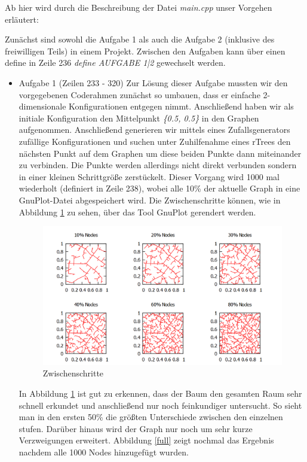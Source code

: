 \documentclass[a4paper]{scrartcl}
\begin{document}
Ab hier wird durch die Beschreibung der Datei \textit{main.cpp} unser Vorgehen erläutert:

Zunächst sind sowohl die Aufgabe 1 als auch die Aufgabe 2 (inklusive des freiwilligen Teils) in einem Projekt. Zwischen den Aufgaben kann über einen define in Zeile 236 \textit{define AUFGABE 1|2} gewechselt werden. 

\begin{itemize}
	\item Aufgabe 1 (Zeilen 233 - 320)
		Zur Lösung dieser Aufgabe mussten wir den vorgegebenen Coderahmen zunächst so umbauen, dass er einfache 2-dimensionale Konfigurationen entgegen nimmt. Anschließend haben wir als initiale Konfiguration den Mittelpunkt \textit{\{0.5, 0.5\}} in den Graphen aufgenommen. Anschließend generieren wir mittels eines Zufallsgenerators zufällige Konfigurationen und suchen unter Zuhilfenahme eines rTrees den nächsten Punkt auf dem Graphen um diese beiden Punkte dann miteinander zu verbinden. Die Punkte werden allerdings nicht direkt verbunden sondern in einer kleinen Schrittgröße zerstückelt. Dieser Vorgang wird 1000 mal wiederholt (definiert in Zeile 238), wobei alle 10\% der aktuelle Graph in eine GnuPlot-Datei abgespeichert wird. Die Zwischenschritte können, wie in Abbildung \ref{inter} zu sehen, über das Tool GnuPlot gerendert werden.
		\begin{figure}[h!]
			\includegraphics[width=\textwidth]{inter.png}
			\caption{Zwischenschritte}
			\label{inter}
		\end{figure}
		In Abbildung \ref{inter} ist gut zu erkennen, dass der Baum den gesamten Raum sehr schnell erkundet und anschließend nur noch feinkundiger untersucht. So sieht man in den ersten 50\% die größten Unterschiede zwischen den einzelnen stufen. Darüber hinaus wird der Graph nur noch um sehr kurze Verzweigungen erweitert. Abbildung \ref{full} zeigt nochmal das Ergebnis nachdem alle 1000 Nodes hinzugefügt wurden.

\end{itemize}
\end{document}
